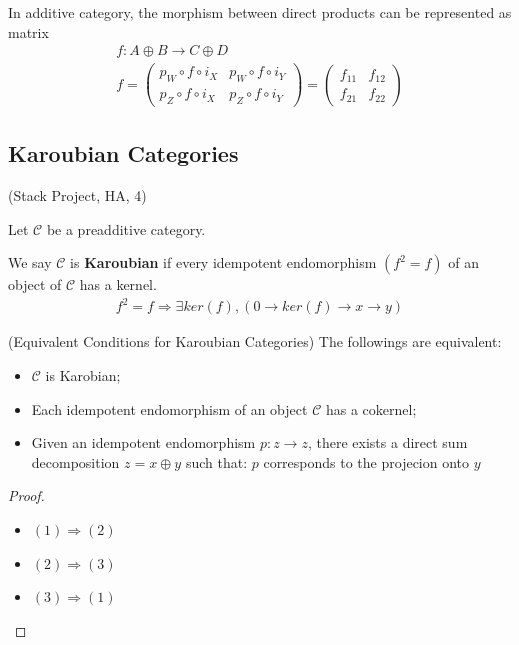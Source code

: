 \documentclass[Total.tex]{subfiles}
\begin{document}
			In additive category, the morphism between direct products can be represented as matrix
			\begin{gather*}
				f:A\oplus B\rightarrow C\oplus D\\
				f=\begin{pmatrix}
					p_W\circ f\circ i_X&p_W\circ f\circ i_Y\\
					p_Z\circ f\circ i_X&p_Z\circ f\circ i_Y
				\end{pmatrix}=\begin{pmatrix}
					f_{11}&f_{12}\\
					f_{21}&f_{22}
				\end{pmatrix}
			\end{gather*}
			\subsection{Karoubian Categories}
			(Stack Project, HA, 4) 
			
			\begin{Def}
				Let $\mathcal{C}$ be a preadditive category. 
				
				We say $\mathcal{C}$ is \textbf{Karoubian} if every idempotent endomorphism $(f^2=f)$ of an object of $\mathcal{C}$ has a kernel.
				\begin{gather*}
					f^2=f\Rightarrow \exists ker(f),(0\rightarrow ker(f)\rightarrow x\rightarrow y)
				\end{gather*}
			\end{Def}
			\begin{proposition}
				(Equivalent Conditions for Karoubian Categories) The followings are equivalent:
				\begin{itemize}
					\item $\mathcal{C}$ is Karobian;
					\item Each idempotent endomorphism of an object $\mathcal{C}$ has a cokernel;
					\item Given an idempotent endomorphism $p:z\rightarrow z$, there exists a direct sum decomposition $z=x\oplus y$ such that: $p$ corresponds to the projecion onto $y$
				\end{itemize}
			\end{proposition}
			\begin{proof}
				\begin{itemize}
					\item $(1)\Rightarrow (2)$
					\item $(2)\Rightarrow (3)$
					\item $(3)\Rightarrow (1)$
				\end{itemize}
			\end{proof}
			
\end{document}
